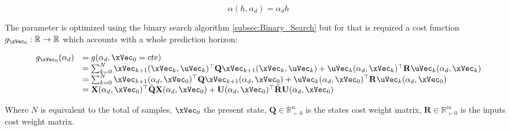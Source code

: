 \begin{equation}
    \alpha(h, \alpha_d) = \alpha_d h
    \label{eq:CBF_Alpha_Formulation_AJO}
\end{equation}

The parameter is optimized using the binary search algorithm \ref{subsec:Binary_Search} but for that is required a cost function \(g_{\xVec_0}:\mathbb{R} \to \mathbb{R}\) which accounts with a whole prediction horizon:

\begin{equation}
    \begin{array}{ll}
        g_{\xVec_0}(\alpha_d) &= g(\alpha_d, \xVec_0 = cte)  \\   
        &= \sum_{k=0}^{N}\xVec_{k+1}(\xVec_k,\uVec_k)^{\top}\mathbf{Q}\xVec_{k+1}(\xVec_k,\uVec_k) +  \uVec_k(\alpha_d,\xVec_k)^{\top}\mathbf{R}\uVec_k(\alpha_d,\xVec_k) \\
        &= \sum_{k=0}^{N}\xVec_{k+1}(\alpha_d,\xVec_0)^{\top}\mathbf{Q}\xVec_{k+1}(\alpha_d,\xVec_0) +  \uVec_k(\alpha_d,\xVec_0)^{\top}\mathbf{R}\uVec_k(\alpha_d,\xVec_0) \\
        &= \mathbf{X}(\alpha_d,\xVec_0)^{\top}\tilde{\mathbf{Q}}\mathbf{X}(\alpha_d,\xVec_0) +  \mathbf{U}(\alpha_d,\xVec_0)^{\top}\tilde{\mathbf{R}}\mathbf{U}(\alpha_d,\xVec_0)
    \end{array}
    \label{eq:Cost_Function_Alpha}
\end{equation}

Where \(N\) is equivalent to the total of samples, \(\xVec_0\) the present state, \(\mathbf{Q} \in \mathbb{R}^n_{\succ 0}\) is the states cost weight matrix, \(\mathbf{R} \in \mathbb{R}^m_{\succ 0}\) is the inputs cost weight matrix.  \par

